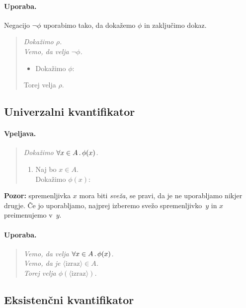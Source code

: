 \paragraph{Uporaba.}
Negacijo $\lnot \phi$ uporabimo tako, da dokažemo $\phi$ in zaključimo dokaz.
%
\begin{quote}
  \sl
  Dokažimo $\rho$.\\
  Vemo, da velja $\lnot\phi$.
  \begin{itemize}
  \item[] Dokažimo $\phi$: \quad {}
  \end{itemize}
  Torej velja $\rho$.
\end{quote}

\subsection{Univerzalni kvantifikator}

\paragraph{Vpeljava.}
\begin{quote}
  \sl
  Dokažimo $\forall x \in A \,.\, \phi(x)$.
  \begin{enumerate}
  \item[] Naj bo $x \in A$. \\
          Dokažimo $\phi(x)$: \quad {}
  \end{enumerate}
\end{quote}
%
\textbf{Pozor:} spremenljivka $x$ mora biti \emph{sveža}, se pravi, da je ne uporabljamo nikjer drugje. Če jo uporabljamo, najprej izberemo svežo spremenljivko~$y$ in $x$ preimenujemo v~$y$.

\paragraph{Uporaba.}
\begin{quote}
  \sl
  Vemo, da velja $\forall x \in A \,.\, \phi(x)$.\\
  Vemo, da je $\langle\text{izraz}\rangle \in A$.\\
  Torej velja $\phi(\langle\text{izraz}\rangle)$.
\end{quote}

\subsection{Eksistenčni kvantifikator}


